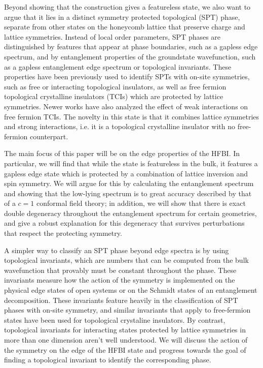 Beyond showing that the construction gives a featureless state, we also want to argue that it lies in a distinct symmetry protected topological (SPT) phase, separate from other states on the honeycomb lattice that preserve charge and lattice symmetries. 
Instead of local order parameters, SPT phases are distinguished by features that appear at phase boundaries, such as a gapless edge spectrum, and by entanglement properties of the groundstate wavefunction, such as a gapless entanglement edge spectrum or topological invariants.
These properties have been previously used to identify SPTs with on-site symmetries, such as free or interacting topological insulators, as well as free fermion topological crystalline insulators (TCIs) which are protected by lattice symmetries. Newer works have also analyzed the effect of weak interactions on free fermion TCIs. 
The novelty in this state is that it combines lattice symmetries and strong interactions, i.e. it is a topological crystalline insulator with no free-fermion counterpart.

The main focus of this paper will be on the edge properties of the HFBI.
In particular, we will find that while the state is featureless in the bulk, it
features a gapless edge state which is protected by a combination of lattice 
inversion
and spin symmetry. We will argue for this by calculating the entanglement 
spectrum and showing
that the low-lying spectrum is to great accuracy described by that of a $c=1$
conformal field theory; in addition, we will show that there is exact double 
degeneracy throughout the entanglement spectrum for certain geometries, and 
give a robust explanation for this degeneracy that survives perturbations that 
respect the protecting symmetry.

A simpler way to classify an SPT phase beyond edge spectra is by using 
topological invariants, which are numbers that can be computed from the bulk 
wavefunction that provably must be constant throughout the phase. These 
invariants measure how the action of the symmetry is implemented on the 
physical edge states of open systems or on the Schmidt states of an 
entanglement decomposition. These invariants feature heavily in the 
classification of SPT phases with on-site symmetry, and similar invariants 
that apply to free-fermion states have been used for topological crystaline 
insulators. By contrast, topological invariants for interacting states 
protected by lattice symmetries in more than one dimension aren't well 
understood. We will discuss the action of the symmetry on the edge of the HFBI 
state and progress towards the goal of finding a topological invariant to 
identify the corresponding phase.

